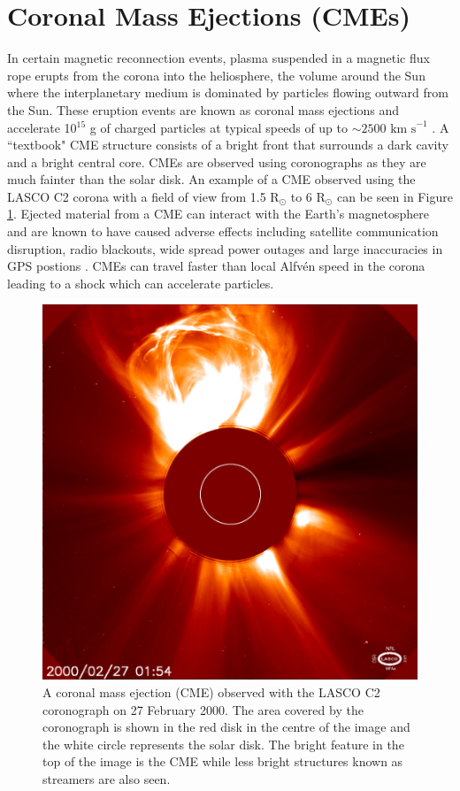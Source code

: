\section{Coronal Mass Ejections (CMEs)}
\label{subsec:CMEs}
In certain magnetic reconnection events, plasma suspended in a magnetic flux rope erupts from the corona into the heliosphere, the volume around the Sun where the interplanetary medium is dominated by particles flowing outward from the Sun. These eruption events are known as coronal mass ejections and accelerate 10$^{15}$ g of charged particles at typical speeds of up to $\sim 2500 \mbox{ km s}^{-1}$ \citep{Gopalswamy2000}. A ``textbook" CME structure consists of a bright front that surrounds a dark cavity and a bright central core. CMEs are observed using coronographs as they are much fainter than the solar disk. An example of a CME observed using the LASCO C2 corona with a field of view from 1.5 R$_\odot$ to 6 R$_\odot$ can be seen in Figure \ref{fig:CME}. Ejected material from a CME can interact with the Earth's magnetosphere and are known to have caused adverse effects including satellite communication disruption, radio blackouts, wide spread power outages and large inaccuracies in GPS postions \citep{Eastwood2017}. CMEs can travel faster than local Alfv\'{e}n speed in the corona leading to a shock which can accelerate particles. 

\begin{figure}[ht]
    \centering
    \includegraphics[width=0.75\columnwidth]{Images/LASCO_C2_CME.jpg}
    \caption[CME observed with the LASCO C2 coronograph on 27 February 2000.]{A coronal mass ejection (CME) observed with the LASCO C2 coronograph on 27 February 2000. The area covered by the coronograph is shown in the red disk in the centre of the image and the white circle represents the solar disk. The bright feature in the top of the image is the CME while less bright structures known as streamers are also seen.  }
    \label{fig:CME}
\end{figure}

